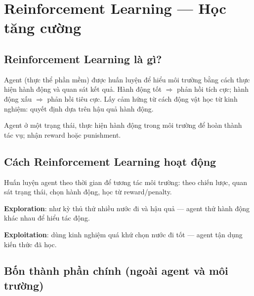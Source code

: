 \section{Reinforcement Learning --- Học tăng cường}
\label{sec:reinforcement-learning}

\subsection{Reinforcement Learning là gì?}

\begin{dinhnghia}[title={Học tăng cường}]
Agent (thực thể phần mềm) được huấn luyện để hiểu môi trường bằng cách thực hiện hành động và quan sát kết quả.
Hành động tốt $\Rightarrow$ phản hồi tích cực; hành động xấu $\Rightarrow$ phản hồi tiêu cực.
Lấy cảm hứng từ cách động vật học từ kinh nghiệm: quyết định dựa trên hậu quả hành động.
\end{dinhnghia}

\begin{vidu}[title={Mô hình RL điển hình}]
Agent ở một trạng thái, thực hiện hành động trong môi trường để hoàn thành tác vụ; nhận reward hoặc punishment.
\end{vidu}

\subsection{Cách Reinforcement Learning hoạt động}

\begin{phuongphap}[title={Vòng lặp agent--môi trường}]
Huấn luyện agent theo thời gian để tương tác môi trường: theo chiến lược, quan sát trạng thái, chọn hành động, học từ reward/penalty.
\end{phuongphap}

\begin{vidu}[title={Ví von kỳ thủ cờ}]
\textbf{Exploration}: như kỳ thủ thử nhiều nước đi và hậu quả --- agent thử hành động khác nhau để hiểu tác động.

\textbf{Exploitation}: dùng kinh nghiệm quá khứ chọn nước đi tốt --- agent tận dụng kiến thức đã học.
\end{vidu}

\subsection{Bốn thành phần chính (ngoài agent và môi trường)}

